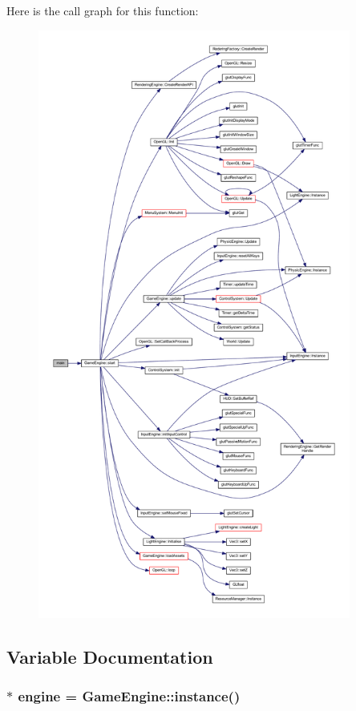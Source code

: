 Here is the call graph for this function\+:\nopagebreak
\begin{figure}[H]
\begin{center}
\leavevmode
\includegraphics[height=550pt]{df/d0a/main_8cpp_a3c04138a5bfe5d72780bb7e82a18e627_cgraph}
\end{center}
\end{figure}




\subsection{Variable Documentation}
\subsubsection[{engine}]{$\ast$ engine = {\bf Game\+Engine\+::instance}()\hspace{0.3cm}{\ttfamily [static]}}\label{main_8cpp_a6f87f331211985776ff3a637e341e819}
